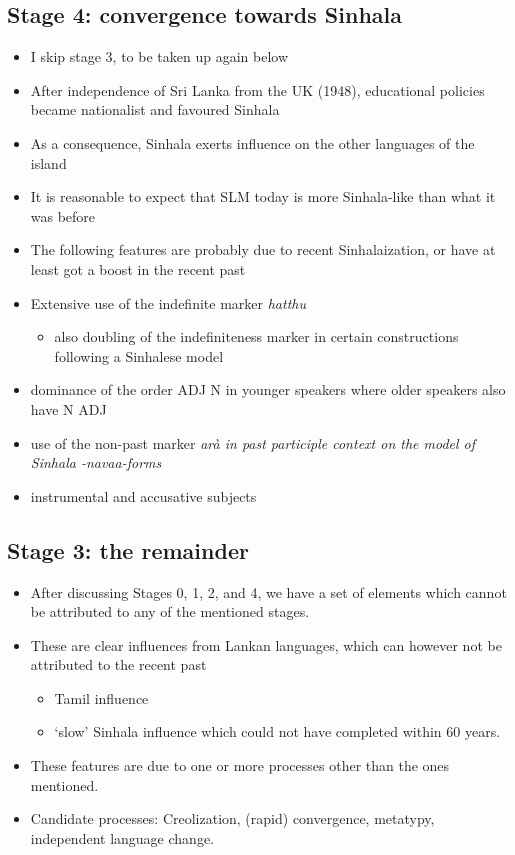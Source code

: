 \documentclass[a4paper,12pt]{article}
\begin{document}
\subsection{Stage 4: convergence towards Sinhala}
\begin{itemize}
 \item I skip stage 3, to be taken up again below
 \item After independence of Sri Lanka from the UK (1948), educational policies became nationalist and favoured Sinhala
 \item As a consequence, Sinhala exerts influence on the other languages of the island
 \item It is reasonable to expect that SLM today is more Sinhala-like than what it was before
 \item The following features are probably due to recent Sinhalaization, or have at least got a boost in the recent past
 \item Extensive use of the indefinite marker \em hatthu\em
 \begin{itemize}
  \item also doubling of the indefiniteness marker in certain constructions following a Sinhalese model \citep{Nordhoff2010ismil}
 \end{itemize}
  \item dominance of the order ADJ N in younger speakers where older speakers also have N ADJ
  \item use of the non-past marker \em arà \em in past participle context on the model of Sinhala \em -navaa\em-forms
  \item instrumental and accusative subjects \citep{Nordhoff2010ismil}
\end{itemize} 
 
\subsection{Stage 3: the remainder}
\begin{itemize}
 \item After discussing Stages 0, 1, 2, and 4, we have a set of elements which cannot be attributed to any of the mentioned stages. 
 \item These are clear influences from Lankan languages, which can however not be attributed to the recent past
 \begin{itemize}
  \item Tamil influence
  \item `slow' Sinhala influence which could not have completed within 60 years. 
 \end{itemize}
 \item These features are due to one or more processes other than the ones mentioned.
 \item Candidate processes: Creolization, (rapid) convergence, metatypy, independent language change.
\end{itemize}
\end{document}
